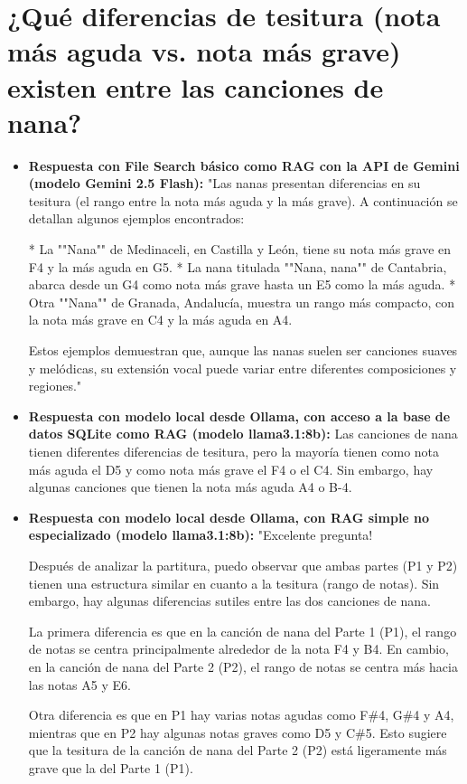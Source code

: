 \section{¿Qué diferencias de tesitura (nota más aguda vs. nota más grave) existen entre las canciones de nana?}
\begin{itemize}
    \item \textbf{Respuesta con File Search básico como RAG con la API de Gemini (modelo Gemini 2.5 Flash):} "Las nanas presentan diferencias en su tesitura (el rango entre la nota más aguda y la más grave). A continuación se detallan algunos ejemplos encontrados:

*   La ""Nana"" de Medinaceli, en Castilla y León, tiene su nota más grave en F4 y la más aguda en G5.
*   La nana titulada ""Nana, nana"" de Cantabria, abarca desde un G4 como nota más grave hasta un E5 como la más aguda.
*   Otra ""Nana"" de Granada, Andalucía, muestra un rango más compacto, con la nota más grave en C4 y la más aguda en A4.

Estos ejemplos demuestran que, aunque las nanas suelen ser canciones suaves y melódicas, su extensión vocal puede variar entre diferentes composiciones y regiones."
    \item \textbf{Respuesta con modelo local desde Ollama, con acceso a la base de datos SQLite como RAG (modelo llama3.1:8b):} Las canciones de nana tienen diferentes diferencias de tesitura, pero la mayoría tienen como nota más aguda el D5 y como nota más grave el F4 o el C4. Sin embargo, hay algunas canciones que tienen la nota más aguda A4 o B-4.
    \item \textbf{Respuesta con modelo local desde Ollama, con RAG simple no especializado (modelo llama3.1:8b):} "Excelente pregunta!

Después de analizar la partitura, puedo observar que ambas partes (P1 y P2) tienen una estructura similar en cuanto a la tesitura (rango de notas). Sin embargo, hay algunas diferencias sutiles entre las dos canciones de nana.

La primera diferencia es que en la canción de nana del Parte 1 (P1), el rango de notas se centra principalmente alrededor de la nota F4 y B4. En cambio, en la canción de nana del Parte 2 (P2), el rango de notas se centra más hacia las notas A5 y E6.

Otra diferencia es que en P1 hay varias notas agudas como F\#4, G\#4 y A4, mientras que en P2 hay algunas notas graves como D5 y C\#5. Esto sugiere que la tesitura de la canción de nana del Parte 2 (P2) está ligeramente más grave que la del Parte 1 (P1).


\end{itemize}
